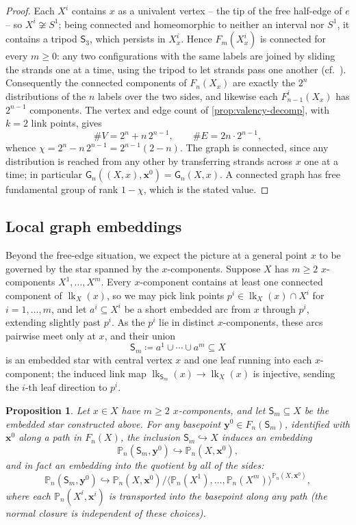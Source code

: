 \documentclass[reqno]{amsart}
\newtheorem{proposition}[theorem]{Proposition}
\theoremstyle{definition}
\newcommand\bfx{\mathbf{x}}
\newcommand\bfy{\mathbf{y}}
\newcommand\sfG{\mathsf{G}}
\newcommand\sfS{\mathsf{S}}
\newcommand{\PB}{\mathbb{P}}
\newcommand{\co}[1]{\mathopen{\langle}#1\mathclose{\rangle}} %
\newcommand{\base}{\bfx^0}
\DeclareMathOperator{\lk}{lk}
\numberwithin{equation}{section}
\begin{document}
\begin{proof}
Each \(X^i\) contains \(x\) as a univalent vertex -- the tip of the
free half-edge of \(e\) -- so \(X^i\not\cong S^1\); being connected
and homeomorphic to neither an interval nor \(S^1\), it contains a
tripod \(\sfS_3\), which persists in \(X^i_x\). Hence
\(F_m(X^i_x)\) is connected for every \(m\geq0\): any two
configurations with the same labels are joined by sliding the
strands one at a time, using the tripod to let strands pass one
another (cf.~\cite{Abrams2000}). Consequently the connected
components of \(F_n(X_x)\) are exactly the \(2^n\) distributions of
the \(n\) labels over the two sides, and likewise each
\(F^i_{n-1}(X_x)\) has \(2^{n-1}\) components. The vertex and edge
count of \cref{prop:valency-decomp}, with \(k=2\) link points,
gives
\[
\#V = 2^n+n\,2^{n-1},
\qquad
\#E = 2n\cdot 2^{n-1},
\]
whence \(\chi=2^n-n\,2^{n-1}=2^{n-1}(2-n)\). The graph is
connected, since any distribution is reached from any other by
transferring strands across \(x\) one at a time; in particular
\(\sfG_n((X,x),\base)=\sfG_n(X,x)\). A connected graph has free
fundamental group of rank \(1-\chi\), which is the stated value.
\end{proof}

\subsection{Local graph embeddings}
\label{ssec:local-graph-embeddings}

Beyond the free-edge situation, we expect the picture at a general
point \(x\) to be governed by the star spanned by the
\(x\)-components. Suppose \(X\) has \(m\geq 2\) \(x\)-components
\(X^1,\dots,X^m\). Every \(x\)-component contains at least one
connected component of \(\lk_X(x)\), so we may pick link points
\(p^i\in\lk_X(x)\cap X^i\) for \(i=1,\dots,m\), and let
\(a^i\subseteq X^i\) be a short embedded arc from \(x\) through
\(p^i\), extending slightly past \(p^i\). As the \(p^i\) lie in
distinct \(x\)-components, these arcs pairwise meet only at \(x\),
and their union
\[
\sfS_m\coloneqq a^1\cup\cdots\cup a^m\subseteq X
\]
is an embedded star with central vertex \(x\) and one leaf running
into each \(x\)-component; the induced link map
\(\lk_{\sfS_m}(x)\to\lk_X(x)\) is injective, sending the \(i\)-th
leaf direction to \(p^i\).

\begin{proposition}\label{prop:star-embedding}
Let \(x\in X\) have \(m\geq 2\) \(x\)-components, and let
\(\sfS_m\subseteq X\) be the embedded star constructed above. For
any basepoint \(\bfy^0\in F_n(\sfS_m)\), identified with \(\base\)
along a path in \(F_n(X)\), the inclusion
\(\sfS_m\hookrightarrow X\) induces an embedding
\[
\PB_n(\sfS_m,\bfy^0)\hookrightarrow\PB_n(X,\base),
\]
and in fact an embedding into the quotient by all of the sides:
\[
\PB_n(\sfS_m,\bfy^0)\hookrightarrow
\PB_n(X,\base)\big/
\co{\PB_n(X^1),\dots,\PB_n(X^m)}^{\PB_n(X,\base)},
\]
where each \(\PB_n(X^i,\bfx^i)\) is transported into the basepoint
along any path (the normal closure is independent of these
choices).
\end{proposition}
\end{document}
